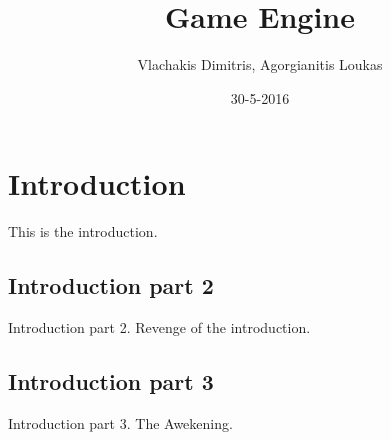 \documentclass{article}
\title{Game Engine}
\date{30-5-2016}
\author{Vlachakis Dimitris, Agorgianitis Loukas}
\begin{document}
	\maketitle
	\newpage
	\tableofcontents
	\newpage

	\section{Introduction}
	This is the introduction.

	\subsection{Introduction part 2}
	Introduction part 2. Revenge of the introduction.

	\subsection{Introduction part 3}
	Introduction part 3. The Awekening.
\end{document}
